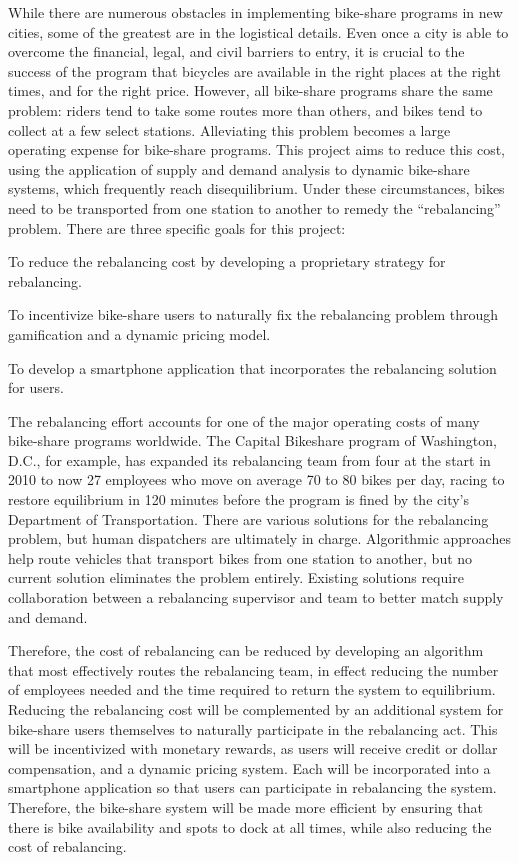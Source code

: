 \documentclass{sig-alternate}
\begin{document}
While there are numerous obstacles in implementing bike-share programs in new cities, some of the greatest are in the logistical details. Even once a city is able to overcome the financial, legal, and civil barriers to entry, it is crucial to the success of the program that bicycles are available in the right places at the right times, and for the right price. However, all bike-share programs share the same problem: riders tend to take some routes more than others, and bikes tend to collect at a few select stations. Alleviating this problem becomes a large operating expense for bike-share programs. This project aims to reduce this cost, using the application of supply and demand analysis to dynamic bike-share systems, which frequently reach disequilibrium. Under these circumstances, bikes need to be transported from one station to another to remedy the ``rebalancing'' problem. There are three specific goals for this project:
\begin{itemize*}
	\item To reduce the rebalancing cost by developing a proprietary strategy for rebalancing.
         \item To incentivize bike-share users to naturally fix the rebalancing problem through gamification and a dynamic pricing model.
         \item To develop a smartphone application that incorporates the rebalancing solution for users.
\end{itemize*}

The rebalancing effort accounts for one of the major operating costs of many bike-share programs worldwide. The Capital Bikeshare program of Washington, D.C., for example, has expanded its rebalancing team from four at the start in 2010 to now 27 employees who move on average 70 to 80 bikes per day, racing to restore equilibrium in 120 minutes before the program is fined by the city's Department of Transportation. There are various solutions for the rebalancing problem, but human dispatchers are ultimately in charge. Algorithmic approaches help route vehicles that transport bikes from one station to another, but no current solution eliminates the problem entirely. Existing solutions require collaboration between a rebalancing supervisor and team to better match supply and demand.
\newline

Therefore, the cost of rebalancing can be reduced by developing an algorithm that most effectively routes the rebalancing team, in effect reducing the number of employees needed and the time required to return the system to equilibrium. Reducing the rebalancing cost will be complemented by an additional system for bike-share users themselves to naturally participate in the rebalancing act. This will be incentivized with monetary rewards, as users will receive credit or dollar compensation, and a dynamic pricing system. Each will be incorporated into a smartphone application so that users can participate in rebalancing the system. Therefore, the bike-share system will be made more efficient by ensuring that there is bike availability and spots to dock at all times, while also reducing the cost of rebalancing.
\end{document}
